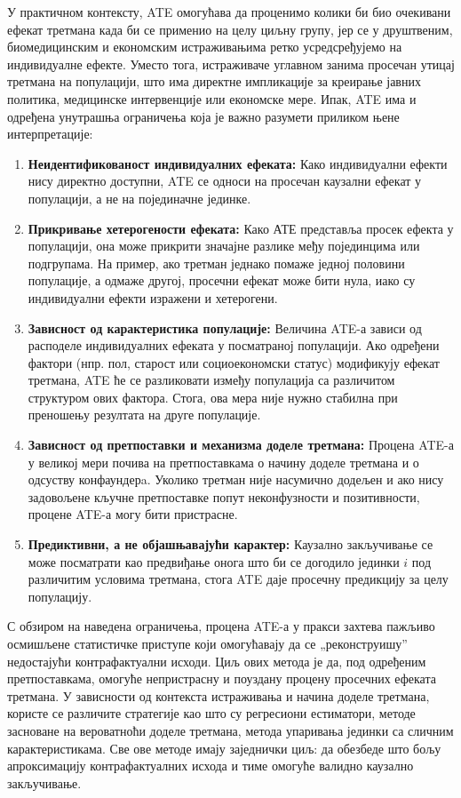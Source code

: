 \documentclass[12pt, a4paper]{article}
\begin{document}
У практичном контексту, ATE омогућава да проценимо колики би био очекивани ефекат третмана када би се применио 
на целу циљну групу, јер се у друштвеним, биомедицинским и економским истраживањима ретко усредсређујемо на индивидуалне ефекте. Уместо тога, истраживаче углавном занима просечан утицај третмана на популацији, што има директне импликације за креирање јавних политика, медицинске интервенције или економске мере. Ипак, ATE има и одређена унутрашња ограничења која је важно разумети приликом њене интерпретације:
\begin{enumerate}
    \item \textbf{Неидентификованост индивидуалних ефеката:}
Како индивидуални ефекти нису директно доступни, ATE се односи на просечан каузални ефекат у популацији, а не на појединачне јединке.
    \item \textbf{Прикривање хетерогености ефеката:}
Како АТЕ представља просек ефекта у популацији, она може прикрити значајне разлике међу појединцима или подгрупама. На пример, ако третман једнако помаже 
једној половини популације, а одмаже другој, просечни ефекат може бити нула, иако су индивидуални ефекти изражени и хетерогени.
    \item \textbf{Зависност од карактеристика популације:}  
Величина ATE-а зависи од расподеле индивидуалних ефеката у посматраној популацији. Ако одређени фактори (нпр. пол, старост или социоекономски статус) модификују 
ефекат третмана, ATE ће се разликовати између популација са различитом структуром ових фактора. Стога, ова мера није нужно стабилна при преношењу резултата на друге 
популације.
    \item \textbf{Зависност од претпоставки и механизма доделе третмана:}  
Процена ATE-а у великој мери почива на претпоставкама о начину доделе третмана и о одсуству конфаундерa. Уколико третман није насумично додељен и ако нису 
задовољене кључне претпоставке попут неконфузности и позитивности, процене ATE-а могу бити пристрасне.
    \item \textbf{Предиктивни, а не објашњавајући карактер:}  
Каузално закључивање се може посматрати као предвиђање онога што би се догодило јединки $i$ под различитим условима третмана, стога ATE даје просечну предикцију за 
целу популацију.
\end{enumerate}

С обзиром на наведена ограничења, процена ATE-а у пракси захтева пажљиво осмишљене статистичке приступе који омогућавају да се „реконструишу” недостајући 
контрафактуални исходи. Циљ ових метода је да, под одређеним претпоставкама, омогуће непристрасну и 
поуздану процену просечних ефеката третмана. У зависности од контекста истраживања и начина доделе третмана, користе се различите стратегије као што су 
регресиони естиматори, методе засноване на вероватноћи доделе третмана, метода упаривања јединки са сличним карактеристикама. Све ове методе имају 
заједнички циљ: да обезбеде што бољу апроксимацију контрафактуалних исхода и тиме омогуће валидно каузално закључивање.
\end{document}
